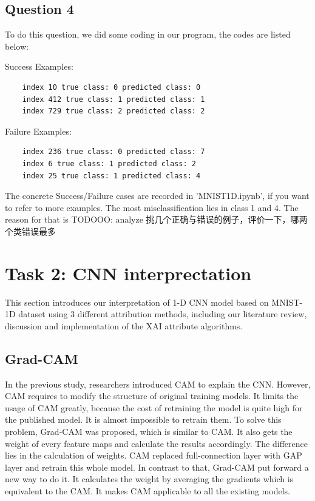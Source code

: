 \documentclass[conference]{IEEEtran}
\begin{document}
\subsection{Question 4}
To do this question, we did some coding in our program, the codes are listed below:

Success Examples:
\begin{lstlisting}
    index 10 true class: 0 predicted class: 0
    index 412 true class: 1 predicted class: 1
    index 729 true class: 2 predicted class: 2
    \end{lstlisting}
Failure Examples:
\begin{lstlisting}
    index 236 true class: 0 predicted class: 7
    index 6 true class: 1 predicted class: 2
    index 25 true class: 1 predicted class: 4
\end{lstlisting}
The concrete Success/Failure cases are recorded in 'MNIST1D.ipynb', if you want to refer to more examples.
The most misclassification lies in class 1 and 4.
The reason for that is TODOOO: analyze
挑几个正确与错误的例子，评价一下，哪两个类错误最多
\section{Task 2: CNN interprectation}

This section introduces our interpretation of 1-D CNN model based on MNIST-1D dataset using 3 different attribution methods, including our literature review, discussion and implementation of the XAI attribute algorithms.

\subsection{Grad-CAM}
In the previous study, researchers introduced CAM to explain the CNN. However, CAM requires to modify the structure of original training models. It limits the usage of CAM greatly, because the cost of retraining the model is quite high for the published model. It is almost impossible to retrain them.
To solve this problem, Grad-CAM was proposed, which is similar to CAM. It also gets the weight of every feature maps and calculate the results accordingly. The difference lies in the calculation of weights. CAM replaced full-connection layer with GAP layer and retrain this whole model. In contrast to that, Grad-CAM put forward a new way to do it.
It calculates the weight by averaging the gradients which is equivalent to the CAM. It makes CAM applicable to all the existing models.\par
\end{document}
